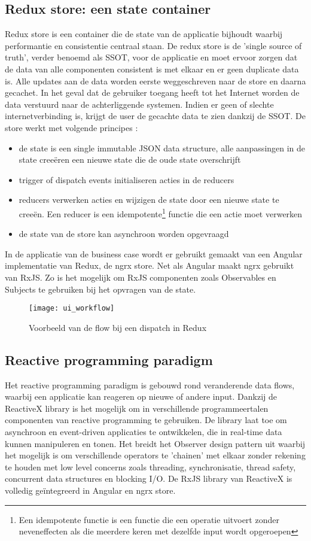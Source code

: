 \subsection{Redux store: een state container}
Redux store is een container die de state van de applicatie bijhoudt waarbij performantie en consistentie centraal staan. De redux store is de 'single source of truth', verder benoemd als SSOT, voor de applicatie en moet ervoor zorgen dat de data van alle componenten consistent is met elkaar en er geen duplicate data is. Alle updates aan de data worden eerste weggeschreven naar de store en daarna gecachet. In het geval dat de gebruiker toegang heeft tot het Internet worden de data verstuurd naar de achterliggende systemen. Indien er geen of slechte internetverbinding is, krijgt de user de gecachte data te zien dankzij de SSOT. De store werkt met volgende \autocite{ngrx-info} principes :
\begin{itemize}  
\item de state is een single immutable JSON data structure, alle aanpassingen in de state cree\"eren een nieuwe state die de oude state overschrijft
\item trigger of dispatch events initialiseren acties in de reducers
\item reducers verwerken acties en wijzigen de state door een nieuwe state te cree\"en. Een reducer is een idempotente\footnote{Een idempotente functie is een functie die een operatie uitvoert zonder neveneffecten als die meerdere keren met dezelfde input wordt opgeroepen} functie die een actie moet verwerken
\item de state van de store kan asynchroon worden opgevraagd
\end{itemize}
In de applicatie van de business case wordt er gebruikt gemaakt van een Angular implementatie van Redux, de ngrx store. Net als Angular maakt ngrx gebruikt van RxJS. Zo is het mogelijk om RxJS componenten zoals Observables en Subjects te gebruiken bij het opvragen van de state.
\begin{figure}[h]
\caption{Voorbeeld van de flow bij een dispatch in Redux}
\centering
\texttt{[image: ui\_workflow]}
\end{figure}
\clearpage
\subsection{Reactive programming paradigm}
\label{subsec:reactive-programming}
Het reactive programming paradigm \autocite{reactivex-intro} is gebouwd rond veranderende data flows, waarbij een applicatie kan reageren op nieuwe of andere input. Dankzij de ReactiveX library is het mogelijk om in verschillende programmeertalen componenten van reactive programming te gebruiken. De library laat toe om asynchroon en event-driven applicaties te ontwikkelen, die in real-time data kunnen manipuleren en tonen. Het breidt het Observer design pattern uit waarbij het mogelijk is om verschillende operators te 'chainen' met elkaar zonder rekening te houden met low level concerns zoals threading, synchronisatie, thread safety, concurrent data structures en blocking I/O. De RxJS library van ReactiveX is volledig ge\"integreerd in Angular en ngrx store.


